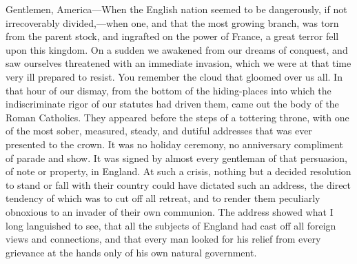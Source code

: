 Gentlemen, America—When the English nation seemed to be dangerously, if not irrecoverably divided,—when one, and that the most growing branch, was torn from the parent stock, and ingrafted on the power of France, a great terror fell upon this kingdom. On a sudden we awakened from our dreams of conquest, and saw ourselves threatened with an immediate invasion, which we were at that time very ill prepared to resist. You remember the cloud that gloomed over us all. In that hour of our dismay, from the bottom of the hiding-places into which the indiscriminate rigor of our statutes had driven them, came out the body of the Roman Catholics. They appeared before the steps of a tottering throne, with one of the most sober, measured, steady, and dutiful addresses that was ever presented to the crown. It was no holiday ceremony, no anniversary compliment of parade and show. It was signed by almost every gentleman of that persuasion, of note or property, in England. At such a crisis, nothing but a decided resolution to stand or fall with their country could have dictated such an address, the direct tendency of which was to cut off all retreat, and to render them peculiarly obnoxious to an invader of their own communion. The address showed what I long languished to see, that all the subjects of England had cast off all foreign views and connections, and that every man looked for his relief from every grievance at the hands only of his own natural government.

